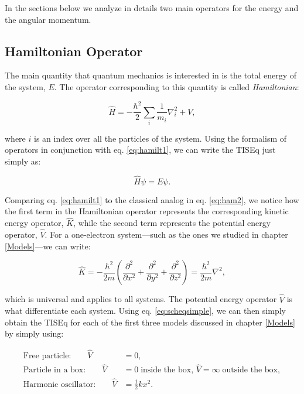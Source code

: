 \documentclass[
  9pt,
]{extbook}
\theoremstyle{definition}
\theoremstyle{definition}
\theoremstyle{definition}
\theoremstyle{remark}
\begin{document}
\normalsize

In the sections below we analyze in details two main operators for the energy and the angular momentum.

\hypertarget{hamiltonian-operator}{%
\subsection{Hamiltonian Operator}\label{hamiltonian-operator}}

The main quantity that quantum mechanics is interested in is the total energy of the system, \(E\). The operator corresponding to this quantity is called \emph{Hamiltonian}:

\begin{equation}
\hat{H} = - \frac{\hbar^2}{2} \sum_i \frac{1}{m_i} \nabla_i^2 + V,
\label{eq:hamilt1}  
\end{equation}

where \(i\) is an index over all the particles of the system. Using the formalism of operators in conjunction with eq. \eqref{eq:hamilt1}, we can write the TISEq just simply as:

\begin{equation}
\hat{H} \psi = E\psi.
\label{eq:scheqsimple}  
\end{equation}

Comparing eq. \eqref{eq:hamilt1} to the classical analog in eq. \eqref{eq:ham2}, we notice how the first term in the Hamiltonian operator represents the corresponding kinetic energy operator, \(\hat{K}\), while the second term represents the potential energy operator, \(\hat{V}\). For a one-electron system---such as the ones we studied in chapter \ref{Models}---we can write:

\begin{equation}
\hat{K}=- \frac{\hbar^2}{2m} \left(\frac{\partial^2}{\partial x^2} + \frac{\partial^2}{\partial y^2} + \frac{\partial^2}{\partial z^2} \right) = \frac{\hbar^2}{2m} \nabla^2,
\label{eq:hamilt2}  
\end{equation}

which is universal and applies to all systems. The potential energy operator \(\hat{V}\) is what differentiate each system. Using eq. \eqref{eq:scheqsimple}, we can then simply obtain the TISEq for each of the first three models discussed in chapter \ref{Models} by simply using:

\begin{equation}
\begin{aligned}
\text{Free particle:}\qquad \hat{V} &= 0, \\
\text{Particle in a box:}\qquad \hat{V} &= 0 \; \text{inside the box, } \hat{V} = \infty \; \text{outside the box},\\
\text{Harmonic oscillator:}\qquad \hat{V} &= \frac{1}{2}kx^2. \\
\end{aligned}
\label{eq:hamilt3}  
\end{equation}
\end{document}
